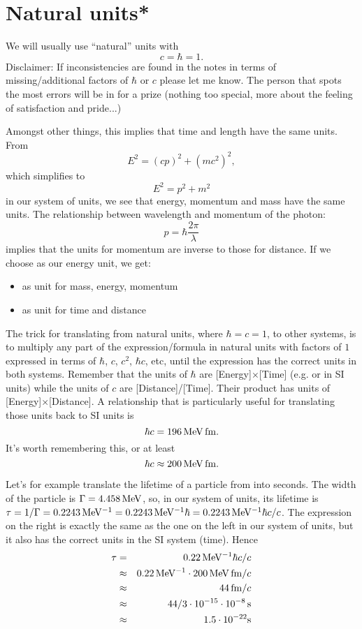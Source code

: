 \section{Natural units*}
\label{sec:naturalUnits}
We will usually use ``natural'' units with 
\[
c=\hbar=1.
\]
 Disclaimer: If inconsistencies are found in the notes in terms of missing/additional
 factors of $\hbar$ or $c$ please let me know. The person that spots the most errors
 will be in for a prize (nothing too special, more about the 
 feeling of satisfaction and pride...) 
 
 Amongst other things, this implies that time and length have the same
 units. From
\[
  E^2 = (cp)^2 + (mc^2)^2,
\]
 which simplifies to
\[
  E^2 = p^2 + m^2
\]
 in our system of units, we see that energy, momentum and mass
 have the same units. The relationship between wavelength and
 momentum of the photon:
\[
   p = \hbar \frac{2\pi}{\lambda}
\]
 implies that the units for momentum are inverse to those for
 distance. If we choose  as our energy unit, we get:
\begin{itemize}
  \item {} as unit for mass, energy, momentum
  \item {} as unit for time and distance
\end{itemize}

The trick for translating from natural units, where $\hbar=c=1$, to
other systems, is to multiply any part of the expression/formula in
natural units with factors of $1$ expressed in terms of $\hbar$, $c$,
$c^2$, $\hbar c$, etc, until the expression has the correct units in
both systems. Remember that the units of $\hbar$ are [Energy]$\times$[Time] (e.g.  or  in SI units) while the units of $c$ are [Distance]/[Time]. Their product has units of [Energy]$\times$[Distance]. A relationship that is particularly useful for translating those units back to SI
 units is
\[
  \hbar c = 196\,\mathrm{MeV\,fm}.
\]
It's worth remembering this, or at least
\[
  \hbar c \approx 200\,\mathrm{MeV\,fm}.
\]

Let's for example translate the lifetime of a particle
from  into seconds. The width of the \prt{\phi} particle is
$\Gamma = 4.458\,\mathrm{MeV}$, so, in our system of units, its lifetime
is $\tau = 1/\Gamma=0.2243\,\mathrm{MeV^{-1}} =0.2243\,\mathrm{MeV^{-1}} \hbar
= 0.2243\,\mathrm{MeV^{-1}} \hbar c/c$. The expression on the right is
exactly the same as the one on the left in our system of units, but it
also has the correct units in the SI system (time). Hence
 \begin{eqnarray*}
\tau &=&       0.22\,\mathrm{MeV^{-1}} \hbar c/c                 \\
     &\approx& 0.22\,\mathrm{MeV^{-1}} \cdot 200\,\mathrm{MeV\,fm} /c      \\
     &\approx&       44\,\mathrm{fm} /c                                \\
     &\approx& 44/3 \cdot 10^{-15}\cdot 10^{-8}\,\mathrm{s}  \\
     &\approx&        1.5 \cdot 10^{-22} \mathrm{s}
\end{eqnarray*}


